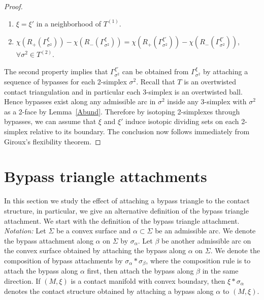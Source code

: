 \documentclass[12pt]{amsart}
\theoremstyle{remark}
\newenvironment{notation}
{\noindent\ignorespaces}
{\par\noindent\ignorespacesafterend}
\newcommand{\be}{\begin{enumerate}}
\newcommand{\ee}{\end{enumerate}}
\begin{document}
\begin{proof}
\be

\item{$\xi={\xi'}$ in a neighborhood of $T^{(1)}$.}

\item{$\chi(R_+(\Gamma^\xi_{\sigma^2}))-\chi(R_-(\Gamma^\xi_{\sigma^2}))=\chi(R_+(\Gamma^{\xi'}_{\sigma^2}))-\chi(R_-(\Gamma^{\xi'}_{\sigma^2}))$, $\forall \sigma^2 \in T^{(2)}$.}

\ee

The second property implies that $\Gamma^{\xi'}_{\sigma^2}$ can be obtained from $\Gamma^\xi_{\sigma^2}$ by attaching a sequence of bypasses for each 2-simplex $\sigma^2$. Recall that $T$ is an overtwisted contact triangulation and in particular each 3-simplex is an overtwisted ball. Hence bypasses exist along any admissible arc in $\sigma^2$ inside any 3-simplex with $\sigma^2$ as a 2-face by Lemma~\ref{Abund}. Therefore by isotoping 2-simplexes through bypasses, we can assume that $\xi$ and $\xi'$ induce isotopic dividing sets on each 2-simplex relative to its boundary. The conclusion now follows immediately from Giroux's flexibility theorem.
\end{proof}


\section{Bypass triangle attachments}

In this section we study the effect of attaching a bypass triangle to the contact structure, in particular, we give an alternative definition of the bypass triangle attachment. We start with the definition of the bypass triangle attachment.\\

\begin{notation}
{\em Notation:} Let $\Sigma$ be a convex surface and $\alpha \subset \Sigma$ be an admissible arc. We denote the bypass attachment along $\alpha$ on $\Sigma$ by $\sigma_\alpha$. Let $\beta$ be another admissible arc on the convex surface obtained by attaching the bypass along $\alpha$ on $\Sigma$. We denote the composition of bypass attachments by $\sigma_\alpha\ast\sigma_\beta$, where the composition rule is to attach the bypass along $\alpha$ first, then attach the bypass along $\beta$ in the same direction. If $(M,\xi)$ is a contact manifold with convex boundary, then $\xi\ast\sigma_\alpha$ denotes the contact structure obtained by attaching a bypass along $\alpha$ to $(M,\xi)$.
\end{notation}
\end{document}
